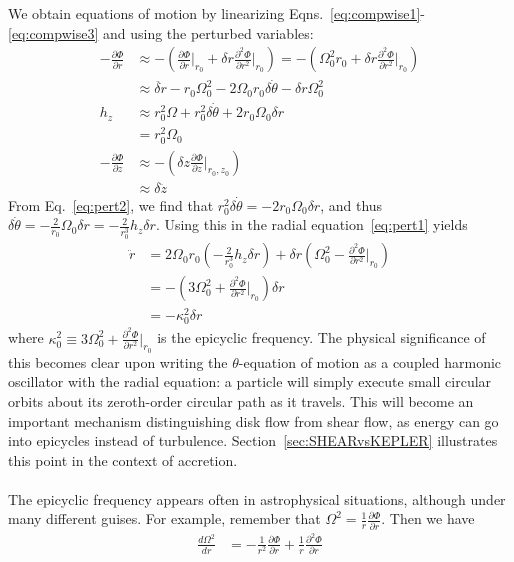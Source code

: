 We obtain equations of motion by linearizing Eqns.~\ref{eq:compwise1}-\ref{eq:compwise3} and using the perturbed variables:
\begin{align}
-\frac{\partial\Phi}{\partial r}&\approx -\left(\frac{\partial\Phi}{\partial r}\Big|_{r_0}+\delta r\frac{\partial^2\Phi}{\partial r^2}\Big|_{r_0}\right)=-\left(\Omega_0^2r_0+\delta r\frac{\partial^2\Phi}{\partial r^2}\Big|_{r_0}\right)\nonumber\\
&\approx\ddot{\delta r}-r_0\Omega_0^2-2\Omega_0r_0\delta\dot\theta-\delta r\Omega_0^2\label{eq:pert1}\\
h_z&\approx r_0^2\Omega+r_0^2\delta\dot\theta+2r_0\Omega_0\delta r\nonumber\\
&= r_0^2\Omega_0\label{eq:pert2}\\
-\frac{\partial\Phi}{\partial z}&\approx -\left(\delta z\frac{\partial\Phi}{\partial z}\Big|_{r_0,z_0}\right)\nonumber\\
&\approx \delta\ddot z
\end{align}
From Eq.~\ref{eq:pert2}, we find that $r_0^2\delta\dot\theta=-2r_0\Omega_0\delta r$, and thus $\delta\dot\theta=-\frac2{r_0}\Omega_0\delta r=-\frac2{r_0^3}h_z\delta r$. Using this in the radial equation~\ref{eq:pert1} yields
\begin{align}
\ddot r&=2\Omega_0r_0\left(-\frac2{r_0^3}h_z\delta r\right)+\delta r\left(\Omega_0^2-\frac{\partial^2\Phi}{\partial r^2}\Big|_{r_0}\right)\\
&=-\left(3\Omega_0^2 +\frac{\partial^2\Phi}{\partial r^2}\Big|_{r_0}\right)\delta r\\
&=-\kappa_0^2 \delta r
\end{align}
where $\kappa_0^2\equiv3\Omega_0^2+\frac{\partial^2\Phi}{\partial r^2}\rvert_{r_0}$ is the epicyclic frequency. The physical significance of this becomes clear upon writing the $\theta$-equation of motion as a coupled harmonic oscillator with the radial equation: a particle will simply execute small circular orbits about its zeroth-order circular path as it travels. This will become an important mechanism distinguishing disk flow from shear flow, as energy can go into epicycles instead of turbulence. Section~\ref{sec:SHEARvsKEPLER} illustrates this point in the context of accretion. \\
\\
The epicyclic frequency appears often in astrophysical situations, although under many different guises. For example, remember that $\Omega^2=\frac1r\frac{\partial\Phi}{\partial r}$. Then we have
\begin{align*}
\frac{d\Omega^2}{dr}&=-\frac1{r^2}\frac{\partial\Phi}{\partial r}+\frac1r\frac{\partial^2\Phi}{\partial r}
\end{align*}
